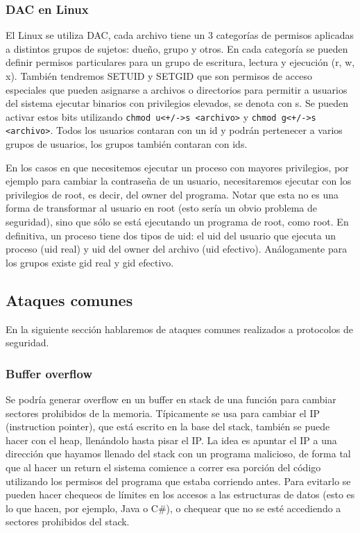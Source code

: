\documentclass{article}
\begin{document}
\subsubsection{DAC en Linux}

El Linux se utiliza DAC, cada archivo tiene un 3 categorías de permisos aplicadas a distintos grupos de sujetos: dueño, grupo y otros. En cada categoría se pueden definir permisos particulares para un grupo de escritura, lectura y ejecución (r, w, x). También tendremos SETUID y SETGID que son permisos de acceso especiales que pueden asignarse a archivos o directorios para permitir a usuarios del sistema ejecutar binarios con privilegios elevados, se denota con s. Se pueden activar estos bits utilizando \verb|chmod u<+/->s <archivo>| y \verb|chmod g<+/->s <archivo>|. Todos los usuarios contaran con un id y podrán pertenecer a varios grupos de usuarios, los grupos también contaran con ids.

En los casos en que necesitemos ejecutar un proceso con mayores privilegios, por ejemplo para cambiar la contraseña de un usuario, necesitaremos ejecutar con los privilegios de root, es decir, del owner del programa. Notar que esta no es una forma de transformar al usuario en root (esto sería un obvio problema de seguridad), sino que sólo se está ejecutando un programa de root, como root. En definitiva, un proceso tiene dos tipos de uid: el uid del usuario que ejecuta un proceso (uid real) y uid del owner del archivo (uid efectivo). Análogamente para los grupos existe gid real y gid efectivo.

\subsection{Ataques comunes}


En la siguiente sección hablaremos de ataques comunes realizados a protocolos de seguridad.

\subsubsection{Buffer overflow}


Se podría generar overflow en un buffer en stack de una función para cambiar sectores prohibidos de la memoria. Típicamente se usa para cambiar el IP (instruction pointer), que está escrito en la base del stack, también se puede hacer con el heap, llenándolo hasta pisar el IP. La idea es apuntar el IP a una dirección que hayamos llenado del stack con un programa malicioso, de forma tal que al hacer un return el sistema comience a correr esa porción del código utilizando los permisos del programa que estaba corriendo antes. Para evitarlo se pueden hacer chequeos de límites en los accesos a las estructuras de datos (esto es lo que hacen, por ejemplo, Java o C\#), o chequear que no se esté accediendo a sectores prohibidos del stack.
\end{document}
